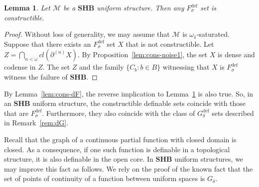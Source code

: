 \documentclass[12pt]{article}
\newcommand{\Mm}{\mathcal{M}}
\newcommand{\dF}{\ensuremath{F_\sigma^{\text{def}}}}
\newcommand{\dG}{\ensuremath{G_\delta^{\text{def}}}}
\newcommand{\BP}{\textbf{SHB}}
\newtheorem{lemma}[theorem]{Lemma}
\theoremstyle{definition}
\theoremstyle{remark}
\begin{document}
\begin{lemma}\label{lem:SHBP-Fsigma-cons}
Let $\Mm$ be a $\BP$ uniform structure. Then any $\dF$ set is constructible.  
\end{lemma}
\begin{proof}
Without loss of generality, we may assume that $\Mm$ is $\omega_1$-saturated. 
Suppose that there exists an $\dF$ set $X$ that is not constructible. Let $Z=\bigcap_{n<\omega} cl(\partial^{(n)} X)$. By Proposition~\ref{lem:cons-noise1}, the set $X$ is dense and codense in $Z$. The set $Z$ and the family $\{ C_b : b\in B\}$ witnessing that $X$ is $\dF$ witness the failure of $\BP$. 
\end{proof}   

By Lemma~\ref{lem:cons-dF}, the reverse implication to Lemma~\ref{lem:SHBP-Fsigma-cons} is also true. So, in an $\BP$ uniform structure, the constructible definable sets coincide with those that are $\dF$. Furthermore, they also coincide with the class of $\dG$ sets described in Remark~\ref{rem:dG}.  

Recall that the graph of a continuous partial function with closed domain is closed. As a consequence, if one such function is definable in a topological structure, it is also definable in the open core. In $\BP$ uniform structures, we may improve this fact as follows. We rely on the proof of the known fact that the set of points of continuity of a function between uniform spaces is $G_\delta$. 

\end{document}
